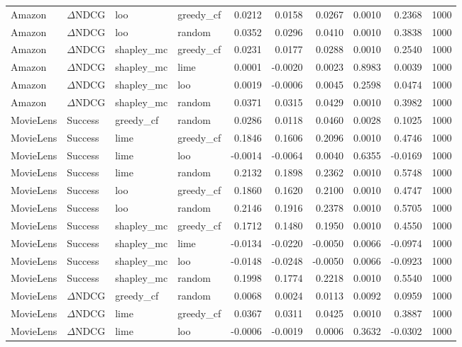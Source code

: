 \begin{longtable}{@{}p{.12\linewidth}p{.18\linewidth}p{.13\linewidth}p{.13\linewidth}rrrrrr@{}}
Amazon & $\Delta$NDCG & loo & greedy\_cf & 0.0212 & 0.0158 & 0.0267 & 0.0010 & 0.2368 & 1000 \\
Amazon & $\Delta$NDCG & loo & random & 0.0352 & 0.0296 & 0.0410 & 0.0010 & 0.3838 & 1000 \\
Amazon & $\Delta$NDCG & shapley\_mc & greedy\_cf & 0.0231 & 0.0177 & 0.0288 & 0.0010 & 0.2540 & 1000 \\
Amazon & $\Delta$NDCG & shapley\_mc & lime & 0.0001 & -0.0020 & 0.0023 & 0.8983 & 0.0039 & 1000 \\
Amazon & $\Delta$NDCG & shapley\_mc & loo & 0.0019 & -0.0006 & 0.0045 & 0.2598 & 0.0474 & 1000 \\
Amazon & $\Delta$NDCG & shapley\_mc & random & 0.0371 & 0.0315 & 0.0429 & 0.0010 & 0.3982 & 1000 \\
MovieLens & Success & greedy\_cf & random & 0.0286 & 0.0118 & 0.0460 & 0.0028 & 0.1025 & 1000 \\
MovieLens & Success & lime & greedy\_cf & 0.1846 & 0.1606 & 0.2096 & 0.0010 & 0.4746 & 1000 \\
MovieLens & Success & lime & loo & -0.0014 & -0.0064 & 0.0040 & 0.6355 & -0.0169 & 1000 \\
MovieLens & Success & lime & random & 0.2132 & 0.1898 & 0.2362 & 0.0010 & 0.5748 & 1000 \\
MovieLens & Success & loo & greedy\_cf & 0.1860 & 0.1620 & 0.2100 & 0.0010 & 0.4747 & 1000 \\
MovieLens & Success & loo & random & 0.2146 & 0.1916 & 0.2378 & 0.0010 & 0.5705 & 1000 \\
MovieLens & Success & shapley\_mc & greedy\_cf & 0.1712 & 0.1480 & 0.1950 & 0.0010 & 0.4550 & 1000 \\
MovieLens & Success & shapley\_mc & lime & -0.0134 & -0.0220 & -0.0050 & 0.0066 & -0.0974 & 1000 \\
MovieLens & Success & shapley\_mc & loo & -0.0148 & -0.0248 & -0.0050 & 0.0066 & -0.0923 & 1000 \\
MovieLens & Success & shapley\_mc & random & 0.1998 & 0.1774 & 0.2218 & 0.0010 & 0.5540 & 1000 \\
MovieLens & $\Delta$NDCG & greedy\_cf & random & 0.0068 & 0.0024 & 0.0113 & 0.0092 & 0.0959 & 1000 \\
MovieLens & $\Delta$NDCG & lime & greedy\_cf & 0.0367 & 0.0311 & 0.0425 & 0.0010 & 0.3887 & 1000 \\
MovieLens & $\Delta$NDCG & lime & loo & -0.0006 & -0.0019 & 0.0006 & 0.3632 & -0.0302 & 1000 \\

\end{longtable}
